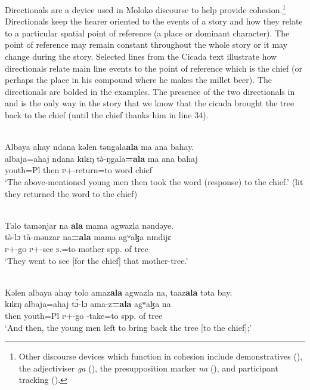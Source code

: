 Directionals are a device used in Moloko discourse to help provide cohesion.\footnote{Other discourse devices which function in cohesion include demonstratives (), the adjectiviser  \textit{ga} (), the presupposition marker \textit{na} (), and participant tracking ().} Directionals keep the hearer oriented to the events of a story and how they relate to a particular spatial point of reference (a place or dominant character). The point of reference may remain constant throughout the whole story or it may change during the story. Selected lines from the Cicada text  illustrate how directionals relate main line events to the point of reference which is the chief (or perhaps the place in his compound where he makes the millet beer). The directionals are bolded in the examples. The presence of the two directionals in  and  is the only way in the story that we know that the cicada brought the tree back to the chief (until the chief thanks him in line 34).


\ea\label{ex:7:116}\\
Albaya  ahay  ndana  kəlen  təngala\textbf{ala}  ma  ana  bahay.\\
\gll  albaja=ahaj  ndana  kɪlɛŋ  t\`ə-ŋgala\textbf{=ala}  ma  ana  bahaj\\
      youth=Pl  {\DEM}  then  \textsc{p}+{\PFV}-return=to    word    {\DAT}   chief\\
\glt  ‘The above-mentioned young men then took the word (response) to the chief.’ (lit they returned the word to the chief)\\
\z 

\ea\label{ex:7:117}\\
Təlo  tamənjar  na \textbf{ ala}  mama  agwazla  nəndəye.\\
\gll  t\`ə-lɔ          tà-mənzar     na\textbf{=ala}     mama      agʷaɮa     nɪndijɛ\\
      \textsc{p}+{\PFV}-go   \textsc{p}+{\HOR}-see    \textsc{s}.{\DO}=to     mother       {spp. of tree}    {\DEM}\\
\glt  ‘They went to see [for the chief] that mother-tree.'\\
\z 

\ea\label{ex:7:118}\\
Kəlen  albaya  ahay  tolo  amaz\textbf{ala}  agwazla  na,  taaz\textbf{ala}  təta  bay.\\
\gll  kɪlɛŋ   albaja=ahaj    t\`ɔ-lɔ ama-z\textbf{=ala}  agʷaɮa  na \\ 
      then   youth=Pl      \textsc{p}+{\PFV}-go  {\DEP}-take=to       {spp. of tree}  {\PSP} \\
\glt ‘And then, the young men left to bring back the tree [to the chief];’\\
      
